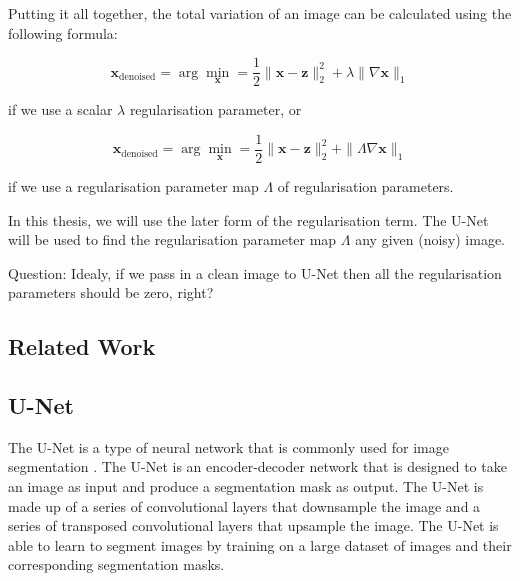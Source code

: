 \documentclass[12pt]{article}
\begin{document}
Putting it all together, the total variation of an image can be calculated using the following formula:

\begin{equation}
  \mathbf{x}_{\text{denoised}} = \arg \min_{\mathbf{x}}  = \frac{1}{2} \|\mathbf{x} - \mathbf{z}\|_2^2 + \lambda \| \nabla \mathbf{x} \|_1
\end{equation}

if we use a scalar $\lambda$ regularisation parameter, or

\begin{equation}
  \mathbf{x}_{\text{denoised}} = \arg \min_{\mathbf{x}}  = \frac{1}{2} \|\mathbf{x} - \mathbf{z}\|_2^2 + \| \Lambda \nabla \mathbf{x} \|_1
\end{equation}

if we use a regularisation parameter map $\Lambda$ of regularisation parameters.

In this thesis, we will use the later form of the regularisation term.
The U-Net will be used to find the regularisation parameter map $\Lambda$ any given (noisy) image.

Question: Idealy, if we pass in a clean image to U-Net then all the regularisation parameters should be zero, right?






\subsection{Related Work}





\subsection{U-Net}

The U-Net is a type of neural network that is commonly used for image segmentation \cite{ronneberger2015unet}.
The U-Net is an encoder-decoder network that is designed to take an image as input and produce a segmentation mask as output.
The U-Net is made up of a series of convolutional layers that downsample the image and a series of transposed convolutional layers that upsample the image.
The U-Net is able to learn to segment images by training on a large dataset of images and their corresponding segmentation masks.
\end{document}
